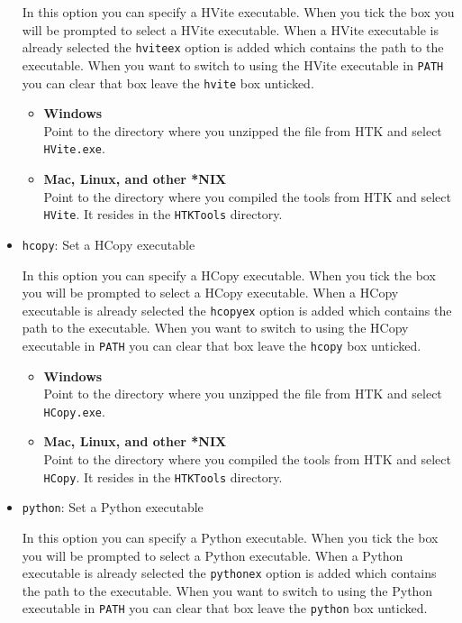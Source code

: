 \begin{itemize}
		In this option you can specify a HVite executable. When you tick the box you
		will be prompted to select a HVite executable. When a HVite executable is
		already selected the \texttt{hviteex} option is added which contains the
		path to the executable. When you want to switch to using the HVite
		executable in \texttt{PATH} you can clear that box leave the \texttt{hvite}
		box unticked.

		\begin{itemize}
			\item \textbf{Windows}\\
				Point to the directory where you unzipped the file
				from HTK and select \texttt{HVite.exe}.
			\item \textbf{Mac, Linux, and other *NIX}\\
				Point to the directory where you compiled the tools from HTK and
				select \texttt{HVite}. It resides in the \texttt{HTKTools}
				directory.
		\end{itemize}
	\item \texttt{hcopy}: %
		Set a HCopy executable

		In this option you can specify a HCopy executable. When you tick the box you
		will be prompted to select a HCopy executable. When a HCopy executable is
		already selected the \texttt{hcopyex} option is added which contains the
		path to the executable. When you want to switch to using the HCopy
		executable in \texttt{PATH} you can clear that box leave the \texttt{hcopy}
		box unticked.

		\begin{itemize}
			\item \textbf{Windows}\\
				Point to the directory where you unzipped the file
				from HTK and select \texttt{HCopy.exe}.
			\item \textbf{Mac, Linux, and other *NIX}\\
				Point to the directory where you compiled the tools from HTK and
				select \texttt{HCopy}. It resides in the \texttt{HTKTools}
				directory.
		\end{itemize}
	\item \texttt{python}: %
		Set a Python executable

		In this option you can specify a Python executable. When you tick the box
		you will be prompted to select a Python executable. When a Python
		executable is already selected the \texttt{pythonex} option is added which
		contains the path to the executable. When you want to switch to using the
		Python executable in \texttt{PATH} you can clear that box leave the
		\texttt{python} box unticked.


\end{itemize}
